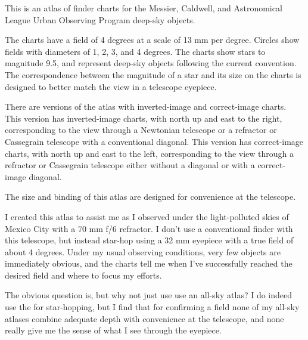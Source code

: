 \begin{figure}[b!]
\begin{center}
\begin{tikzpicture}
        \end{tikzpicture}

    \end{center}
\end{figure}

This is an atlas of finder charts for the Messier, Caldwell, and Astronomical League Urban Observing Program deep-sky objects.

The charts have a field of 4 degrees at a scale of 13 mm per degree. Circles show fields with diameters of 1, 2, 3, and 4 degrees. The charts show stars to magnitude 9.5, and represent deep-sky objects following the current convention. The correspondence between the magnitude of a star and its size on the charts is designed to better match the view in a telescope eyepiece.

There are versions of the atlas with inverted-image and correct-image charts.
\ifinverted
This version has inverted-image charts, with north up and east to the right, corresponding to the view through a Newtonian telescope or a refractor or Cassegrain telescope with a conventional diagonal.
\else
This version has correct-image charts, with north up and east to the left, corresponding to the view through a refractor or Cassegrain telescope either without a diagonal or with a correct-image diagonal.
\fi

The size and binding of this atlas are designed for convenience at the telescope.

\clearpage

I created this atlas to assist me as I observed under the light-polluted skies of Mexico City with a 70 mm f/6 refractor. I don't use a conventional finder with this telescope, but instead star-hop using a 32 mm eyepiece with a true field of about 4 degrees. Under my usual observing conditions, very few objects are immediately obvious, and the charts tell me when I've successfully reached the desired field and where to focus my efforts.

The obvious question is, but why not just use use an all-sky atlas? I do indeed use the {\PSA} for star-hopping, but I find that for confirming a field none of my all-sky atlases combine adequate depth with convenience at the telescope, and none really give me the sense of what I see through the eyepiece.


